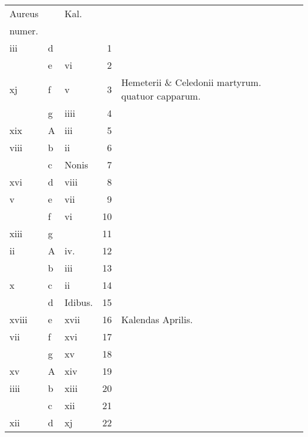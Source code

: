 \documentclass[openany]{book}
\begin{document}
\begin{center}
\begin{tabular}{l | l | l | r | l r}
\color{Red}Aureus & & \color{Red} Kal. & & \color{Red} \\
\color{Red}numer. & & & & \color{Red} \\
\color{Red} iii & d & & 1 & & \color{Red} \\
\color{Red}  & e & \color{Red} vi & 2 & & \color{Red} \\
\color{Red} xj & f & \color{Red} v & 3 & Hemeterii \& Celedonii martyrum. \color{Red} quatuor capparum. & \color{Red} \\
\color{Red}  & g & \color{Red} iiii & 4 & & \color{Red} \\
\color{Red} xix & \color{Red} A & \color{Red} iii & 5 & & \color{Red} \\
\color{Red} viii & b & \color{Red} ii & 6 & & \color{Red} \\
\color{Red}  & c & Nonis & 7 & & \color{Red} \\
\color{Red} xvi & d & \color{Red} viii & 8 & & \color{Red} \\
\color{Red} v & e & \color{Red} vii & 9 & & \color{Red} \\
\color{Red}  & f & \color{Red} vi & 10 & & \color{Red} \\
\color{Red} xiii & g & & 11 & & \color{Red} \\%
\color{Red} ii & \color{Red} A & \color{Red} iv. & 12 & & \color{Red} \\
\color{Red}  & b & \color{Red} iii & 13 & & \color{Red} \\
\color{Red} x & c & \color{Red} ii & 14 & & \color{Red} \\
\color{Red}  & d & Idibus. & 15 & & \color{Red} \\
\color{Red} xviii & e & \color{Red} xvii & 16 & \qquad \color{Red} Kalendas Aprilis. & \color{Red} \\
\color{Red} vii & f & \color{Red} xvi & 17 & & \color{Red} \\
\color{Red}  & g & \color{Red} xv & 18 & & \color{Red} \\
\color{Red} xv & \color{Red} A & \color{Red} xiv & 19 & & \color{Red} \\
\color{Red} iiii & b & \color{Red} xiii & 20 & & \color{Red} \\
\color{Red}  & c & \color{Red} xii & 21 & & \color{Red} \\
\color{Red} xii & d & \color{Red} xj & 22 & & \color{Red} \\

\end{tabular}
\end{center}
\end{document}
